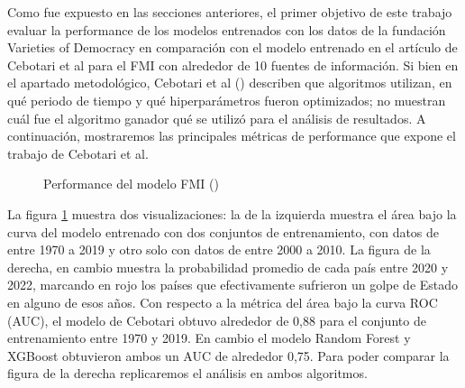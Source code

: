 \documentclass{article}
\begin{document}
Como fue expuesto en las secciones anteriores, el primer objetivo de este trabajo evaluar la performance
de los modelos entrenados con los datos de la fundación Varieties of Democracy en comparación con el modelo
entrenado en el artículo de Cebotari et al para el FMI con alrededor de 10 fuentes de información. Si bien
en el apartado metodológico, Cebotari et al (\citeyear{Ceb24}) describen que algoritmos utilizan, en qué periodo
de tiempo y qué hiperparámetros fueron optimizados; no muestran cuál fue el algoritmo ganador qué se utilizó
para el análisis de resultados. A continuación, mostraremos las principales métricas de performance que
expone el trabajo de Cebotari et al.

\begin{figure}[H]
 \centering
 \caption{Performance del modelo FMI (\cite{Ceb24}) \label{fig:metricas_cebotari}}
\end{figure}

La figura \ref{fig:metricas_cebotari} muestra dos visualizaciones: la de la izquierda muestra el área
bajo la curva del modelo entrenado con dos conjuntos de entrenamiento, con datos de entre 1970 a 2019
y otro solo con datos de entre 2000 a 2010. La figura de la derecha, en cambio muestra la probabilidad
promedio de cada país entre 2020 y 2022, marcando en rojo los países que efectivamente sufrieron un
golpe de Estado en alguno de esos años. Con respecto a la métrica del área bajo la curva ROC (AUC), el 
modelo de Cebotari obtuvo alrededor de 0,88 para el conjunto de entrenamiento entre 1970 y 2019. En
cambio el modelo Random Forest y XGBoost obtuvieron ambos un AUC de alrededor 0,75. Para poder comparar
la figura de la derecha replicaremos el análisis en ambos algoritmos.
\end{document}
